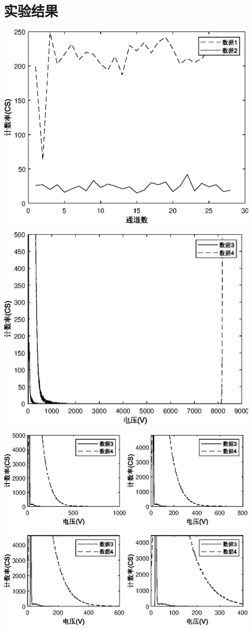 \documentclass[UTF8]{ctexart}
\makeatletter
\newcommand{\figcaption}{\def\@captype{figure}\caption}
\makeatother
\begin{document}
\section{实验结果}
\begin{center}
	\includegraphics{channel.eps}
	\figcaption{通道与计数分布}\label{channel}
	\includegraphics{voltage.eps}
	\figcaption{电压与计数分布}\label{voltage}
	\includegraphics{voltagesub.eps}

\end{center}
\end{document}
